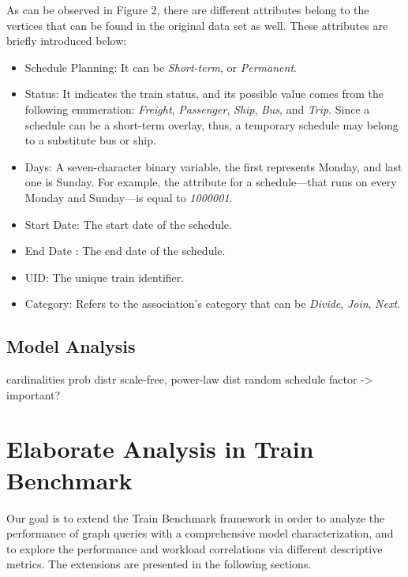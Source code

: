 As can be observed in Figure 2, %
there are different attributes belong to the vertices that can be found in the original data set as well. These attributes are briefly introduced below:
\begin{itemize}
	\item{\textsf{Schedule Planning}}: It can be \textit{Short-term}, or \textit{Permanent}.
	\item{\textsf{Status}}: It indicates the train status, and its possible value comes from the following enumeration: \textit{Freight}, \textit{Passenger}, \textit{Ship}, \textit{Bus}, and \textit{Trip}. Since a schedule can be a short-term overlay, thus, a temporary schedule may belong to a substitute bus or ship.
	\item{\textsf{Days}}: A seven-character binary variable, the first represents Monday, and last one is Sunday. For example, the attribute for a schedule---that runs on every Monday and Sunday---is equal to \textit{1000001}.
	\item{\textsf{Start Date}}: The start date of the schedule.
	\item{\textsf{End Date}} : The end date of the schedule.
	\item{\textsf{UID}}: The unique train identifier.
	\item{\textsf{Category}}: Refers to the association's category that can be \textit{Divide}, \textit{Join}, \textit{Next}.
\end{itemize}


\subsection{Model Analysis}\label{sec:model_analysis}
cardinalities
	prob distr
	scale-free, power-law dist
	random schedule factor -> important?





\section{Elaborate Analysis in Train Benchmark}

Our goal is to extend the Train Benchmark framework in order to analyze the performance of graph queries with a comprehensive model characterization, and to explore the performance and workload correlations via different descriptive metrics. The extensions are presented in the following sections.

